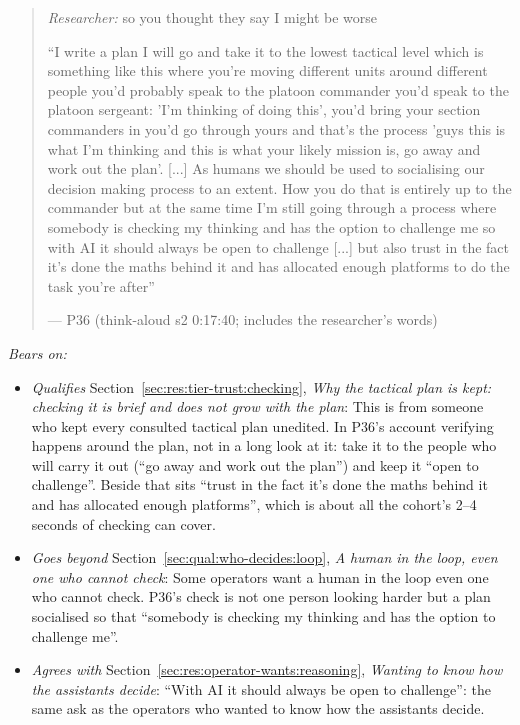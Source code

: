 \begin{quote}\small
{\footnotesize\textit{Researcher:} so you thought they say I might be worse}\par\smallskip
``I write a plan I will go and take it to the lowest tactical level which is something like this where you're moving different units around different people you'd probably speak to the platoon commander you'd speak to the platoon sergeant: 'I'm thinking of doing this', you'd bring your section commanders in you'd go through yours and that's the process 'guys this is what I'm thinking and this is what your likely mission is, go away and work out the plan'. [...] As humans we should be used to socialising our decision making process to an extent. How you do that is entirely up to the commander but at the same time I'm still going through a process where somebody is checking my thinking and has the option to challenge me so with AI it should always be open to challenge [...] but also trust in the fact it's done the maths behind it and has allocated enough platforms to do the task you're after''\par\hfill--- P36 (think-aloud s2 0:17:40; includes the researcher's words)
\end{quote}

\noindent\textit{Bears on:}
\begin{itemize}[leftmargin=1.2em,itemsep=1pt]\small
\item \textit{Qualifies} Section~\ref{sec:res:tier-trust:checking}, \emph{Why the tactical plan is kept: checking it is brief and does not grow with the plan}: This is from someone who kept every consulted tactical plan unedited. In P36's account verifying happens around the plan, not in a long look at it: take it to the people who will carry it out (``go away and work out the plan'') and keep it ``open to challenge''. Beside that sits ``trust in the fact it's done the maths behind it and has allocated enough platforms'', which is about all the cohort's 2--4 seconds of checking can cover.
\item \textit{Goes beyond} Section~\ref{sec:qual:who-decides:loop}, \emph{A human in the loop, even one who cannot check}: Some operators want a human in the loop even one who cannot check. P36's check is not one person looking harder but a plan socialised so that ``somebody is checking my thinking and has the option to challenge me''.
\item \textit{Agrees with} Section~\ref{sec:res:operator-wants:reasoning}, \emph{Wanting to know how the assistants decide}: ``With AI it should always be open to challenge'': the same ask as the operators who wanted to know how the assistants decide.
\end{itemize}

